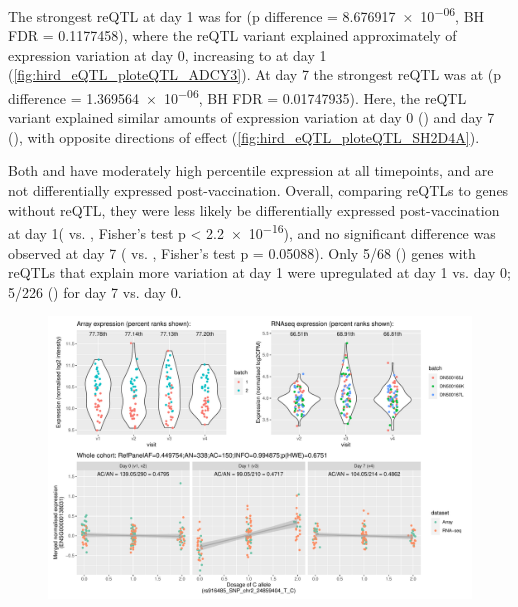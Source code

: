 The strongest reQTL at day 1 was for  (p difference = \num{8.676917e-06}, BH FDR = \num{0.1177458}),
where the \gls{reQTL} variant explained approximately  of expression variation at day 0, increasing to  at day 1 (\autoref{fig:hird_eQTL_ploteQTL_ADCY3}).
At day 7 the strongest \gls{reQTL} was at  (p difference = \num{1.369564e-06}, BH FDR = \num{0.01747935}).
Here, the \gls{reQTL} variant explained similar amounts of expression variation at day 0 () and day 7 (), with opposite directions of effect (\autoref{fig:hird_eQTL_ploteQTL_SH2D4A}).

Both  and  have moderately high percentile expression at all timepoints, and are not differentially expressed post-vaccination.
Overall, comparing \glspl{reQTL} to genes without reQTL,
they were less likely be differentially expressed post-vaccination at day 1( vs. , Fisher's test p < \num{2.2e-16}),
and no significant difference was observed at day 7 ( vs. , Fisher's test p = \num{0.05088}).
Only 5/68 () genes with \glspl{reQTL} that explain more variation at day 1 were upregulated at day 1 vs. day 0; 5/226 () for day 7 vs. day 0.

\begin{figure}
    \centering
    \includegraphics[width=1.0\textwidth,page=1]{mainmatter/figures/chapter_03/plot_dge_eqtl_genotypes.ENSG00000138031,rs916485_SNP_chr2_24859404_T_C.pdf}
    \caption{}
    \label{fig:hird_eQTL_ploteQTL_ADCY3}
\end{figure}


